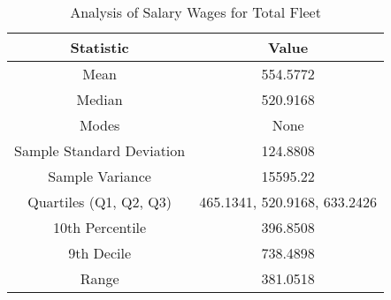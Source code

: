 \begin{table}[H]
    \centering
    \caption{Analysis of Salary Wages for Total Fleet}
    \begin{tabular}{|c|c|}
        \hline
        Statistic                 & Value                        \\
        \hline
        Mean                      & 554.5772                     \\
        Median                    & 520.9168                     \\
        Modes                     & None                         \\
        Sample Standard Deviation & 124.8808                     \\
        Sample Variance           & 15595.22                     \\
        Quartiles (Q1, Q2, Q3)    & 465.1341, 520.9168, 633.2426 \\
        10th Percentile           & 396.8508                     \\
        9th Decile                & 738.4898                     \\
        Range                     & 381.0518                     \\
        \hline
    \end{tabular}
\end{table}
